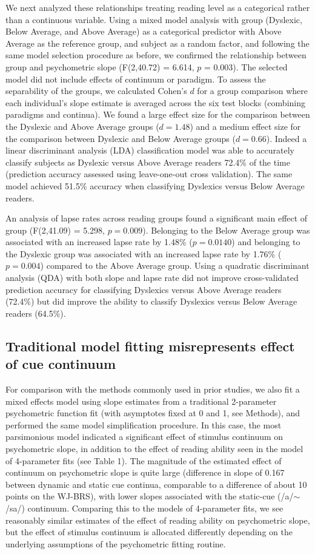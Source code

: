 \documentclass[../uwthesis.tex]{subfiles}
\begin{document}
We next analyzed these relationships treating reading level as a categorical rather than a continuous variable. Using a mixed model analysis with group (Dyslexic, Below Average, and Above Average) as a categorical predictor with Above Average as the reference group, and subject as a random factor, and following the same model selection procedure as before, we confirmed the relationship between group and psychometric slope (F(2,40.72)  = 6.614, $p$ = 0.003). The selected model did not include effects of continuum or paradigm. To assess the separability of the groups, we calculated Cohen’s $d$ for a group comparison where each individual’s slope estimate is averaged across the six test blocks (combining paradigms and continua). We found a large effect size for the comparison between the Dyslexic and Above Average groups ($d=1.48$) and a medium effect size for the comparison between Dyslexic and Below Average groups ($d=0.66$). Indeed a linear discriminant analysis (LDA) classification model was able to accurately classify subjects as Dyslexic versus Above Average readers 72.4\% of the time (prediction accuracy assessed using leave-one-out cross validation). The same model achieved 51.5\% accuracy when classifying Dyslexics versus Below Average readers. 

An analysis of lapse rates across reading groups found a significant main effect of group (F(2,41.09) = 5.298, $p = 0.009$). Belonging to the Below Average group was associated with an increased lapse rate by 1.48\% ($p = 0.0140$) and belonging to the Dyslexic group was associated with an increased lapse rate by 1.76\% ($p = 0.004$) compared to the Above Average group. Using a quadratic discriminant analysis (QDA) with both slope and lapse rate did not improve cross-validated prediction accuracy for classifying Dyslexics versus Above Average readers (72.4\%) but did improve the ability to classify Dyslexics versus Below Average readers (64.5\%).

\subsection{Traditional model fitting misrepresents effect of cue continuum}
For comparison with the methods commonly used in prior studies, we also fit a mixed effects model using slope estimates from a traditional 2-parameter psychometric function fit (with asymptotes fixed at 0 and 1, see Methods), and performed the same model simplification procedure. In this case, the most parsimonious model indicated a significant effect of stimulus continuum on psychometric slope, in addition to the effect of reading ability seen in the model of 4-parameter fits (see Table 1). The magnitude of the estimated effect of continuum on psychometric slope is quite large (difference in slope of 0.167 between dynamic and static cue continua, comparable to a difference of about 10 points on the WJ-BRS), with lower slopes associated with the static-cue (/a/$\sim$/sa/) continuum. Comparing this to the models of 4-parameter fits, we see reasonably similar estimates of the effect of reading ability on psychometric slope, but the effect of stimulus continuum is allocated differently depending on the underlying assumptions of the psychometric fitting routine.
\end{document}
